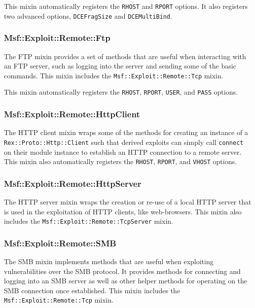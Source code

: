\documentclass{report}
\begin{document}
\par
This mixin automatically registers the \texttt{RHOST} and
\texttt{RPORT} options.  It also registers two advanced options,
\texttt{DCEFragSize} and \texttt{DCEMultiBind}.

            \subsubsection{Msf::Exploit::Remote::Ftp}

\par
The FTP mixin provides a set of methods that are useful when
interacting with an FTP server, such as logging into the server and
sending some of the basic commands.  This mixin includes the
\texttt{Msf::Exploit::Remote::Tcp} mixin.

\par
This mixin automatically registers the \texttt{RHOST},
\texttt{RPORT}, \texttt{USER}, and \texttt{PASS} options.

            \subsubsection{Msf::Exploit::Remote::HttpClient}

\par
The HTTP client mixin wraps some of the methods for creating an
instance of a \texttt{Rex::Proto::Http::Client} such that derived
exploits can simply call \texttt{connect} on their module instance
to establish an HTTP connection to a remote server.  This mixin also
automatically registers the \texttt{RHOST}, \texttt{RPORT}, and
\texttt{VHOST} options.

            \subsubsection{Msf::Exploit::Remote::HttpServer}

\par
The HTTP server mixin wraps the creation or re-use of a local HTTP
server that is used in the exploitation of HTTP clients, like
web-browsers.  This mixin also includes the
\texttt{Msf::Exploit::Remote::TcpServer} mixin.

            \subsubsection{Msf::Exploit::Remote::SMB}

\par
The SMB mixin implements methods that are useful when exploiting
vulnerabilities over the SMB protocol.  It provides methods for
connecting and logging into an SMB server as well as other helper
methods for operating on the SMB connection once established.  This
mixin includes the \texttt{Msf::Exploit::Remote::Tcp} mixin.
\end{document}
